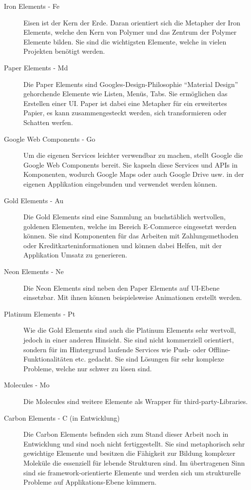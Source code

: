 \begin{description}
  \item[Iron Elements - Fe] Eisen ist der Kern der Erde. Daran orientiert sich die Metapher der Iron Elements, welche den Kern von Polymer und das Zentrum der Polymer Elemente bilden. Sie sind die wichtigsten Elemente, welche in vielen Projekten benötigt werden.
  \item[Paper Elements - Md] Die Paper Elements sind Googles-Design-Philosophie ``Material Design'' gehorchende Elemente wie Listen, Menüs, Tabs. Sie ermöglichen das Erstellen einer \ac{UI}. Paper ist dabei eine Metapher für ein erweitertes Papier, es kann zusammengesteckt werden, sich transformieren oder Schatten werfen.
  \item[Google Web Components - Go] Um die eigenen Services leichter verwendbar zu machen, stellt Google die Google Web Components bereit. Sie kapseln diese Services und \ac{API}s in Komponenten, wodurch Google Maps oder auch Google Drive usw. in der eigenen Applikation eingebunden und verwendet werden können.
  \item[Gold Elements - Au] Die Gold Elements sind eine Sammlung an buchstäblich wertvollen, goldenen Elementen, welche im Bereich E-Commerce eingesetzt werden können. Sie sind Komponenten für das Arbeiten mit Zahlungsmethoden oder Kreditkarteninformationen und können dabei Helfen, mit der Applikation Umsatz zu generieren.
  \item[Neon Elements - Ne] Die Neon Elements sind neben den Paper Elements auf \ac{UI}-Ebene einsetzbar. Mit ihnen können beispielsweise Animationen erstellt werden.
  \item[Platinum Elements - Pt] Wie die Gold Elements sind auch die Platinum Elements sehr wertvoll, jedoch in einer anderen Hinsicht. Sie sind nicht kommerziell orientiert, sondern für im Hintergrund laufende Services wie Push- oder Offline-Funktionalitäten etc. gedacht. Sie sind Lösungen für sehr komplexe Probleme, welche nur schwer zu lösen sind.
  \item[Molecules - Mo] Die Molecules sind weitere Elemente als Wrapper für third-party-Libraries.
  \item[Carbon Elements - C (in Entwicklung)] Die Carbon Elements befinden sich zum Stand dieser Arbeit noch in Entwicklung und sind noch nicht fertiggestellt. Sie sind metaphorisch sehr gewichtige Elemente und besitzen die Fähigkeit zur Bildung komplexer Moleküle die essenziell für lebende Strukturen sind. Im übertragenen Sinn sind sie framework-orientierte Elemente und werden sich um strukturelle Probleme auf Applikations-Ebene kümmern.
\end{description}


